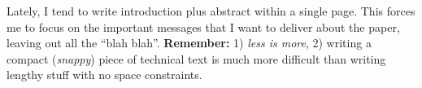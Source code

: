 \begin{remark} 
Lately, I tend to write introduction plus abstract within a single page. This forces me to focus on the important messages that I want to deliver about the paper, leaving out all the ``blah blah''. \textbf{Remember:} 1) {\it less is more}, 2) writing a compact ({\it snappy}) piece of technical text is much more difficult than writing lengthy stuff with no space constraints.
\end{remark}
\fi